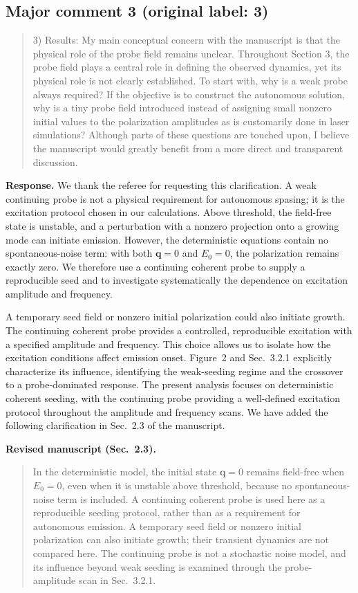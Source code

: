 \documentclass[11pt,a4paper]{article}
\newif\ifshowrevisions
\newcommand{\revised}[1]{{\ifshowrevisions\color{revisionblue}\fi #1}}
\newcommand{\reviewercomment}[1]{\begin{quote}\small #1\end{quote}}
\newcommand{\response}[1]{\par\textbf{Response.} #1\par}
\newcommand{\manuscripttext}[2]{\par\textbf{Revised manuscript (#1).}\begin{quote}\revised{#2}\end{quote}}
\begin{document}
\subsection*{Major comment 3 (original label: 3)}
\label{r1-major-3}
\reviewercomment{
3) Results: My main conceptual concern with the manuscript is that the physical role of the probe field remains unclear. Throughout Section 3, the probe field plays a central role in defining the observed dynamics, yet its physical role is not clearly established. To start with, why is a weak probe always required? If the objective is to construct the autonomous solution, why is a tiny probe field introduced instead of assigning small nonzero initial values to the polarization amplitudes as is customarily done in laser simulations? Although parts of these questions are touched upon, I believe the manuscript would greatly benefit from a more direct and transparent discussion.
}
\response{We thank the referee for requesting this clarification. A weak continuing probe is not a physical requirement for autonomous spasing; it is the excitation protocol chosen in our calculations. Above threshold, the field-free state is unstable, and a perturbation with a nonzero projection onto a growing mode can initiate emission. However, the deterministic equations contain no spontaneous-noise term: with both $\mathbf q=0$ and $E_0=0$, the polarization remains exactly zero. We therefore use a continuing coherent probe to supply a reproducible seed and to investigate systematically the dependence on excitation amplitude and frequency.

A temporary seed field or nonzero initial polarization could also initiate growth. The continuing coherent probe provides a controlled, reproducible excitation with a specified amplitude and frequency. This choice allows us to isolate how the excitation conditions affect emission onset. Figure~2 and Sec.~3.2.1 explicitly characterize its influence, identifying the weak-seeding regime and the crossover to a probe-dominated response. The present analysis focuses on deterministic coherent seeding, with the continuing probe providing a well-defined excitation protocol throughout the amplitude and frequency scans. We have added the following clarification in Sec.~2.3 of the manuscript.}
\manuscripttext{Sec.~2.3}{In the deterministic model, the initial state $\mathbf q=0$ remains field-free when $E_0=0$, even when it is unstable above threshold, because no spontaneous-noise term is included. A continuing coherent probe is used here as a reproducible seeding protocol, rather than as a requirement for autonomous emission. A temporary seed field or nonzero initial polarization can also initiate growth; their transient dynamics are not compared here. The continuing probe is not a stochastic noise model, and its influence beyond weak seeding is examined through the probe-amplitude scan in Sec.~3.2.1.}
\end{document}

